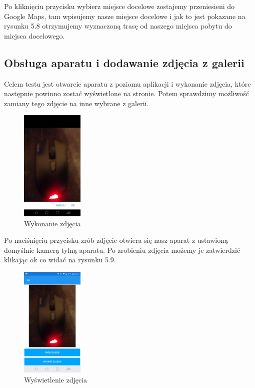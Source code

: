 Po kliknięciu przycisku wybierz miejsce docelowe zostajemy przeniesieni do Google Maps, tam wpisujemy nasze miejsce docelowe i jak to jest pokazane na rysunku 5.8 otrzymujemy wyznaczoną trasę od naszego miejsca pobytu do miejsca docelowego.

\subsection{Obsługa aparatu i dodawanie zdjęcia z galerii}

\hspace{1cm} Celem testu jest otwarcie aparatu z poziomu aplikacji i wykonanie zdjęcia, które następnie powinno zostać wyświetlone na stronie. Potem sprawdzimy możliwość zamiany tego zdjęcie na inne wybrane z galerii.

\begin{figure}[!htb]
	\begin{center}
		\includegraphics[width=3cm]{rys/ZZfoto.png}
		\caption{Wykonanie zdjęcia}
		\label{rys:rysunek037}
	\end{center}
\end{figure}

Po naciśnięciu przycisku zrób zdjęcie otwiera się nasz aparat z ustawioną domyślnie kamerą tylną aparatu. Po zrobieniu zdjęcia możemy je zatwierdzić klikając ok co widać na rysunku 5.9.

\begin{figure}[!htb]
	\begin{center}
		\includegraphics[width=3cm]{rys/ZZfoto2.png}
		\caption{Wyświetlenie zdjęcia}
		\label{rys:rysunek038}
	\end{center}
\end{figure}

